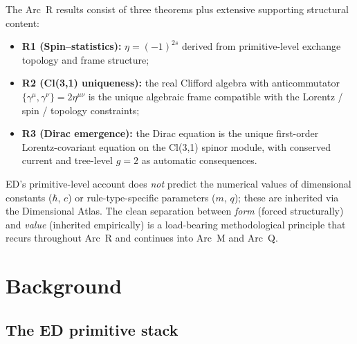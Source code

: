 \documentclass[11pt,a4paper]{article}
\begin{document}
The Arc~R results consist of three theorems plus extensive supporting structural content:
\begin{itemize}
  \item \textbf{R1 (Spin--statistics):} $\eta = (-1)^{2s}$ derived from primitive-level exchange topology and frame structure;
  \item \textbf{R2 (Cl(3,1) uniqueness):} the real Clifford algebra with anticommutator $\{\gamma^\mu, \gamma^\nu\} = 2\eta^{\mu\nu}$ is the unique algebraic frame compatible with the Lorentz / spin / topology constraints;
  \item \textbf{R3 (Dirac emergence):} the Dirac equation is the unique first-order Lorentz-covariant equation on the Cl(3,1) spinor module, with conserved current and tree-level $g = 2$ as automatic consequences.
\end{itemize}

ED's primitive-level account does \emph{not} predict the numerical values of dimensional constants ($\hbar$, $c$) or rule-type-specific parameters ($m$, $q$); these are inherited via the Dimensional Atlas. The clean separation between \emph{form} (forced structurally) and \emph{value} (inherited empirically) is a load-bearing methodological principle that recurs throughout Arc~R and continues into Arc~M and Arc~Q.

\section{Background}

\subsection{The ED primitive stack}
\end{document}
